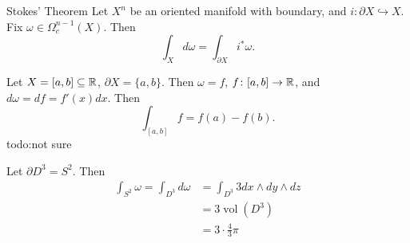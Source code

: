 \begin{namedthm}{Stokes' Theorem} 
    Let $X^n $ be an oriented manifold with boundary, and $i \colon \partial X\hookrightarrow X$. Fix $\omega \in \Omega_c^{n-1}(X)$. Then \[
    \int_X d\omega=\int _{\partial X}i^*\omega.
    \]  
\end{namedthm}
\begin{example}
    Let $X=[a,b] \subseteq \mathbb{R}$, $\partial X=\{a,b\} $. Then $\omega=f$, $f \colon [a,b] \to \mathbb{R}$, and $d\omega =df=f'(x)dx$. Then \[
        \int _{[a,b]}f=f(a)-f(b).
    \] {\color{red}todo:not sure} 
\end{example}
\begin{example}
    Let $\partial D^3=S^2$. Then 
    \begin{align*}
        \int _{S^2}\omega =\int _{D^3}d\omega &=\int _{D^3}3 dx\wedge dy\wedge dz\\
                                              &=3 \operatorname{vol}(D^3)\\
                                              &=3 \cdot \frac{4}{3}\pi
    \end{align*}
\end{example}
